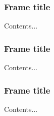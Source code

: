 \documentclass[9pt,aspectratio=169,]{beamer}
\begin{document}
\begin{frame}
\frametitle{Frame title}
Contents...
\end{frame}

\begin{frame}
\frametitle{Frame title}
Contents...
\end{frame}

\begin{frame}
\frametitle{Frame title}
Contents...
\end{frame}
\end{document}
